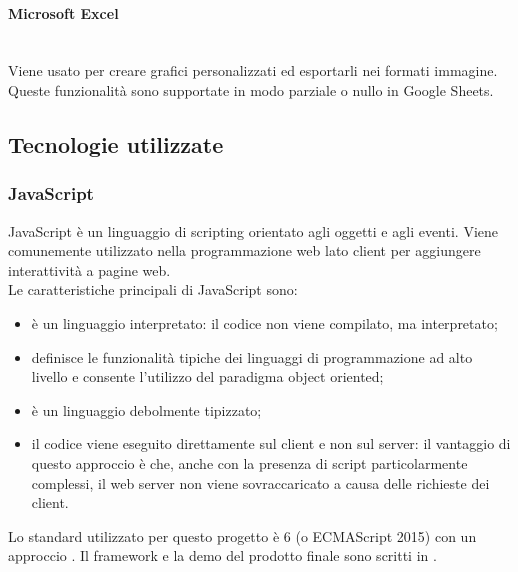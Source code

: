 \paragraph{Microsoft Excel} \mbox{}\\
Viene usato per creare grafici personalizzati ed esportarli nei formati immagine. Queste funzionalità sono supportate in modo parziale o nullo in Google Sheets.

\subsection{Tecnologie utilizzate}
\subsubsection{JavaScript}
JavaScript è un linguaggio di scripting orientato agli oggetti e agli eventi. Viene comunemente utilizzato nella programmazione web lato client per aggiungere interattività a pagine web.\\
Le caratteristiche principali di JavaScript sono:
\begin{itemize}
	\item è un linguaggio interpretato: il codice non viene compilato, ma interpretato;
	\item definisce le funzionalità tipiche dei linguaggi di programmazione ad alto livello e consente l'utilizzo del paradigma object oriented;
	\item è un linguaggio debolmente tipizzato;
	\item il codice viene eseguito direttamente sul client e non sul server: il vantaggio di questo approccio è che, anche con la presenza di script particolarmente complessi, il web server non viene sovraccaricato a causa delle richieste dei client.
\end{itemize}
Lo standard utilizzato per questo progetto è  6 (o {ECMAScript} 2015) con un approccio .
Il framework e la demo del prodotto finale sono scritti in .

